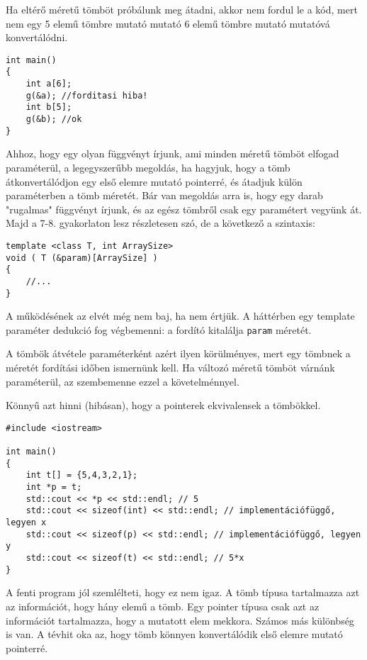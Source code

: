 \documentclass[a4paper,11.5pt,table]{article}
\begin{document}
	Ha eltérő méretű tömböt próbálunk meg átadni, akkor nem fordul le a kód, mert nem egy 5 elemű tömbre mutató mutató 6 elemű tömbre mutató mutatóvá konvertálódni.
	\begin{lstlisting}
int main()
{
	int a[6];
	g(&a); //forditasi hiba!
	int b[5];
	g(&b); //ok
}
	\end{lstlisting}
	\begin{note}
		Ahhoz, hogy egy olyan függvényt írjunk, ami minden méretű tömböt elfogad paraméterül, a legegyszerűbb megoldás, ha hagyjuk, hogy a tömb átkonvertálódjon egy első elemre mutató pointerré, és átadjuk külön paraméterben a tömb méretét. Bár van megoldás arra is, hogy egy darab "rugalmas" függvényt írjunk, és az egész tömbről csak egy paramétert vegyünk át. Majd a 7-8. gyakorlaton lesz részletesen szó, de a következő a szintaxis:
		\begin{lstlisting}
template <class T, int ArraySize>
void ( T (&param)[ArraySize] )
{
	//...
}
		\end{lstlisting}
		\smallskip
		A működésének az elvét még nem baj, ha nem értjük. A háttérben egy template paraméter dedukció fog végbemenni: a fordító kitalálja \texttt{param} méretét. 
		
		\smallskip
		A tömbök átvétele paraméterként azért ilyen körülményes, mert egy tömbnek a méretét fordítási időben ismernünk kell. Ha változó méretű tömböt várnánk paraméterül, az szembemenne ezzel a követelménnyel.  
	\end{note}
	Könnyű azt hinni (hibásan), hogy a pointerek ekvivalensek a tömbökkel.
	\begin{lstlisting}
#include <iostream>

int main()
{
	int t[] = {5,4,3,2,1};
	int *p = t;
	std::cout << *p << std::endl; // 5
	std::cout << sizeof(int) << std::endl; // implementációfüggő, legyen x
	std::cout << sizeof(p) << std::endl; // implementációfüggő, legyen y
	std::cout << sizeof(t) << std::endl; // 5*x
}
	\end{lstlisting} A fenti program jól szemlélteti, hogy ez nem igaz. A tömb típusa tartalmazza azt az információt, hogy hány elemű a tömb. Egy pointer típusa csak azt az információt tartalmazza, hogy a mutatott elem mekkora. Számos más különbség is van. A tévhit oka az, hogy tömb könnyen konvertálódik első elemre mutató pointerré.
\end{document}
